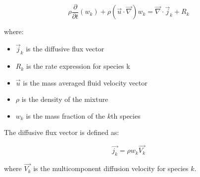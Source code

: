 \documentclass[paper=a4, fontsize=13pt]{scrartcl}
\begin{document}
\begin{equation} \label{eq:transport heavy species COMSOL}
\rho \frac{\partial }{\partial t} (w_k)+ \rho (\vec{u} \cdot \vec{\nabla}) w_k = \vec{\nabla} \cdot \vec{j}_k + R_k
\end{equation}

where:

\begin{itemize}

\item $\vec{j}_k$ is the diffusive flux vector
\item $R_k$ is the rate expression for species k
\item $\vec{u}$ is the mass averaged fluid velocity vector
\item $\rho$ is the density of the mixture
\item $w_k$ is the mass fraction of the $k$th species

\end{itemize}

The diffusive flux vector is defined as:

\begin{equation} 
\vec{j_k} = \rho w_k \vec{V_k}
\end{equation}

where $\vec{V_k}$ is the multicomponent diffusion velocity for species $k$.







\end{document}
